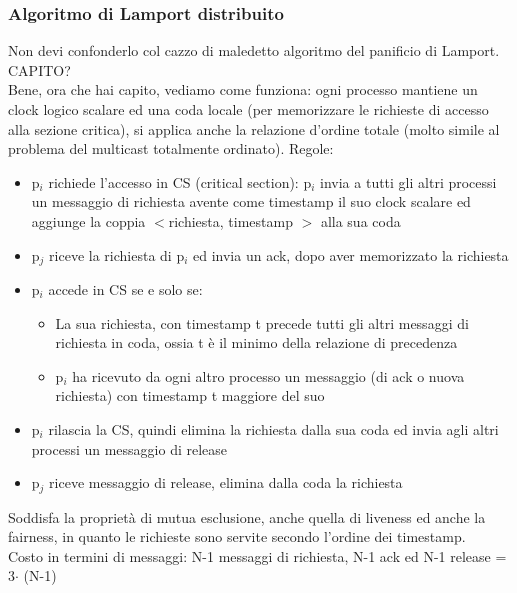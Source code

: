 \documentclass{article}
\begin{document}
\subsubsection{Algoritmo di Lamport distribuito}
Non devi confonderlo col cazzo di maledetto algoritmo del panificio di Lamport. CAPITO?\\ Bene, ora che hai capito, vediamo come funziona: ogni processo mantiene un clock logico scalare ed una coda locale (per memorizzare le richieste di accesso alla sezione critica), si applica anche la relazione d'ordine totale (molto simile al problema del multicast totalmente ordinato). Regole:
\begin{itemize}
\item p$_i$ richiede l'accesso in CS (critical section): p$_i$ invia a tutti gli altri processi un messaggio di richiesta avente come timestamp il suo clock scalare ed aggiunge la coppia $<$richiesta, timestamp $>$ alla sua coda
\item p$_j$ riceve la richiesta di p$_i$ ed invia un ack, dopo aver memorizzato la richiesta
\item p$_i$ accede in CS se e solo se:
\begin{itemize}
\item La sua richiesta, con timestamp t precede tutti gli altri messaggi di richiesta in coda, ossia t è il minimo della relazione di precedenza
\item p$_i$ ha ricevuto da ogni altro processo un messaggio (di ack o nuova richiesta) con timestamp t maggiore del suo
\end{itemize} 
\item p$_i$ rilascia la CS, quindi elimina la richiesta dalla sua coda ed invia agli altri processi un messaggio di release
\item p$_j$ riceve messaggio di release, elimina dalla coda la richiesta 
\end{itemize}
Soddisfa la proprietà di mutua esclusione, anche quella di liveness ed anche la fairness, in quanto le richieste sono servite secondo l'ordine dei timestamp.\\ Costo in termini di messaggi: N-1 messaggi di richiesta, N-1 ack ed N-1 release = 3$\cdot$ (N-1)
\end{document}

